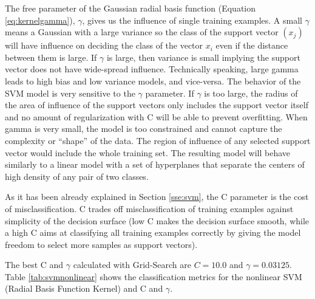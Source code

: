 \documentclass[11pt]{article}
\begin{document}
The free parameter of the Gaussian radial basis function (Equation \ref{eq:kernelgamma}), $\gamma$, gives us the influence of  single training examples. 
A small  $\gamma$ means a Gaussian with a large variance so the class of the support vector $(x_j)$ will have influence on deciding the class of the vector $x_i$ even if the distance between them is large. If  $\gamma$ is large, then variance is small implying the support vector does not have wide-spread influence. Technically speaking, large gamma leads to high bias and low variance models, and vice-versa.
The behavior of the SVM model is very sensitive to the $\gamma$ parameter. If $\gamma$ is too large, the radius of the area of influence of the support vectors only includes the support vector itself and no amount of regularization with C will be able to prevent overfitting.
When gamma is very small, the model is too constrained and cannot capture the complexity or “shape” of the data. The region of influence of any selected support vector would include the whole training set. The resulting model will behave similarly to a linear model with a set of hyperplanes that separate the centers of high density of any pair of two classes.


As it has been already explained in Section \ref{sse:svm}, the C parameter is the cost of misclassification. C trades off misclassification of training examples against simplicity of the decision surface (low C makes the decision surface smooth, while a high C aims at classifying all training examples correctly by giving the model freedom to select more samples as support vectors). 


The best C and $\gamma$ calculated with Grid-Search are $C= 10.0$ and $\gamma= 0.03125$. %
Table \ref{tab:svmnonlinear} shows the classification metrics for the nonlinear SVM (Radial Basis Function Kernel) and C and $\gamma$.
\end{document}
